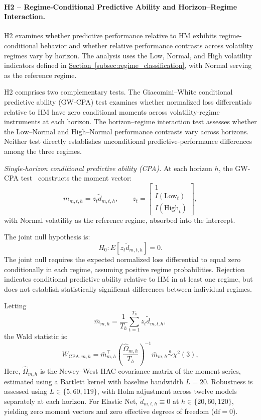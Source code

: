 \documentclass[runningheads,orivec]{llncs}
\begin{document}
\paragraph{H2 -- Regime-Conditional Predictive Ability and Horizon--Regime Interaction.} H2 examines whether predictive performance relative to HM exhibits regime-conditional behavior and whether relative performance contrasts across volatility regimes vary by horizon. The analysis uses the Low, Normal, and High volatility indicators defined in \hyperref[subsec:regime_classification]{Section~\ref*{subsec:regime_classification}}, with Normal serving as the reference regime.

H2 comprises two complementary tests. The Giacomini--White conditional predictive ability (GW-CPA) test examines whether normalized loss differentials relative to HM have zero conditional moments across volatility-regime instruments at each horizon. The horizon--regime interaction test assesses whether the Low--Normal and High--Normal performance contrasts vary across horizons. Neither test directly establishes unconditional predictive-performance differences among the three regimes.

\textit{Single-horizon conditional predictive ability (CPA).} At each horizon $h$, the GW-CPA test~\cite{giacomini2006} constructs the moment vector:
\begin{equation}
m_{m,t,h}=z_t\widetilde d_{m,t,h},
\qquad
z_t=
\begin{bmatrix}
1\\
I(\mathrm{Low}_t)\\
I(\mathrm{High}_t)
\end{bmatrix},
\end{equation}
with Normal volatility as the reference regime, absorbed into the intercept.

The joint null hypothesis is:
\begin{equation}
H_0: E[z_t\widetilde d_{m,t,h}]=0.
\end{equation}
The joint null requires the expected normalized loss differential to equal zero conditionally in each regime, assuming positive regime probabilities. Rejection indicates conditional predictive ability relative to HM in at least one regime, but does not establish statistically significant differences between individual regimes.

Letting
\begin{equation}
\bar m_{m,h} = \frac{1}{T_h}\sum_{t=1}^{T_h}z_t\widetilde d_{m,t,h},
\end{equation}
the Wald statistic is:
\begin{equation}
W_{\mathrm{CPA},m,h}
=
\bar m_{m,h}^{\top}
\left(
\frac{\widehat\Omega_{m,h}}{T_h}
\right)^{-1}
\bar m_{m,h}
\overset{a}{\sim}\chi^2(3),
\end{equation}
Here, $\widehat\Omega_{m,h}$ is the Newey--West HAC covariance matrix of the moment series, estimated using a Bartlett kernel with baseline bandwidth $L=20$. Robustness is assessed using $L\in\{5,60,119\}$, with Holm adjustment across twelve models separately at each horizon. For Elastic Net, $\widetilde d_{m,t,h}\equiv 0$ at $h\in\{20,60,120\}$, yielding zero moment vectors and zero effective degrees of freedom ($\mathrm{df}=0$).
\end{document}
